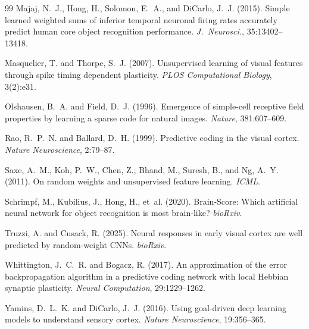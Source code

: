 \documentclass[10pt,twocolumn]{article}
\begin{document}
\begin{thebibliography}{99}
Majaj, N.~J., Hong, H., Solomon, E.~A., and DiCarlo, J.~J. (2015). Simple learned weighted sums of inferior temporal neuronal firing rates accurately predict human core object recognition performance. \textit{J.\ Neurosci.}, 35:13402--13418.

Masquelier, T. and Thorpe, S.~J. (2007). Unsupervised learning of visual features through spike timing dependent plasticity. \textit{PLOS Computational Biology}, 3(2):e31.

Olshausen, B.~A. and Field, D.~J. (1996). Emergence of simple-cell receptive field properties by learning a sparse code for natural images. \textit{Nature}, 381:607--609.

Rao, R.~P.~N. and Ballard, D.~H. (1999). Predictive coding in the visual cortex. \textit{Nature Neuroscience}, 2:79--87.

Saxe, A.~M., Koh, P.~W., Chen, Z., Bhand, M., Suresh, B., and Ng, A.~Y. (2011). On random weights and unsupervised feature learning. \textit{ICML}.

Schrimpf, M., Kubilius, J., Hong, H., et~al. (2020). Brain-Score: Which artificial neural network for object recognition is most brain-like? \textit{bioRxiv}.

Truzzi, A. and Cusack, R. (2025). Neural responses in early visual cortex are well predicted by random-weight CNNs. \textit{bioRxiv}.

Whittington, J.~C.~R. and Bogacz, R. (2017). An approximation of the error backpropagation algorithm in a predictive coding network with local Hebbian synaptic plasticity. \textit{Neural Computation}, 29:1229--1262.

Yamins, D.~L.~K. and DiCarlo, J.~J. (2016). Using goal-driven deep learning models to understand sensory cortex. \textit{Nature Neuroscience}, 19:356--365.

\end{thebibliography}
\end{document}
